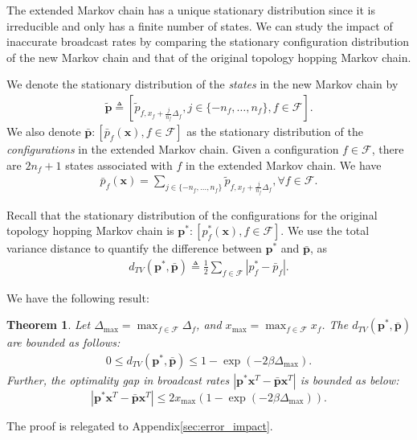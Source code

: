 \documentclass[10pt,conference]{IEEEtran}
\newtheorem{theorem}{\bf Theorem}
\begin{document}
The extended Markov chain has a unique stationary distribution since
it is irreducible and only has a finite number of states. We can study
the impact of inaccurate broadcast rates by comparing the stationary
configuration distribution of the new Markov chain and that
of the original topology hopping Markov chain.

We denote the stationary distribution of the \emph{states} in the
new Markov chain by \begin{align}
\boldsymbol{\tilde{p}}\triangleq[\tilde{p}_{f,x_{f}+\frac{j}{n_{f}}\Delta_{f}},j\in\{-n_{f},\ldots,n_{f}\},f\in\mathcal{F}].\end{align}
We also denote $\boldsymbol{\bar{p}}:[\bar{p}_{f}(\boldsymbol{x}),f\in\mathcal{F}]$
as the stationary distribution of the \emph{configurations} in the
extended Markov chain. Given a configuration $f\in\mathcal{F}$, there
are $2n_{f}+1$ states associated with $f$ in the extended Markov
chain. We have \begin{align}
\bar{p}_{f}(\boldsymbol{x})=\sum_{j\in\{-n_{f},\ldots,n_{f}\}}\tilde{p}_{f,x_{f}+\frac{j}{n_{f}}\Delta_{f}},\forall f\in\mathcal{F}.\end{align}

Recall that the stationary distribution of the configurations for
the original topology hopping Markov chain is $\boldsymbol{p^{*}}:[p_{f}^{*}(\boldsymbol{x}),f\in\mathcal{F}]$.
We use the total variance distance \cite{Diaconis91} to quantify
the difference between $\boldsymbol{p^{*}}$ and $\boldsymbol{\bar{p}}$,
as \begin{align}
d_{TV}(\boldsymbol{p^{*}},\boldsymbol{\bar{p}})\triangleq\frac{1}{2}\sum\limits _{f\in\mathcal{F}}|p_{f}^{*}-\bar{p}_{f}|.\end{align}

We have the following result: \begin{theorem} \label{error_impact}
Let $\Delta_{\max}=\max_{f\in\mathcal{F}}\Delta_{f}$, and $x_{\max}=\max_{f\in\mathcal{F}}x_{f}$.
The $d_{TV}(\boldsymbol{p^{*}},\boldsymbol{\bar{p}})$ are bounded
as follows: \begin{align}
0\le d_{TV}(\boldsymbol{p^{*}},\boldsymbol{\bar{p}})\le1-\exp\left(-2\beta\Delta_{\max}\right).\label{upper_bound}\end{align}
 Further, the optimality gap in broadcast rates $|\boldsymbol{p^{*}}\boldsymbol{x}^T-\boldsymbol{\bar{p}}\boldsymbol{x}^T|$ is bounded as below:
\begin{equation}
|\boldsymbol{p^{*}}\boldsymbol{x}^T-\boldsymbol{\bar{p}}\boldsymbol{x}^T|\leq 2x_{\max}(1-\exp(-2\beta\Delta_{\max})).
\end{equation}
\end{theorem}
The proof is relegated to Appendix\ref{sec:error_impact}.
\end{document}
